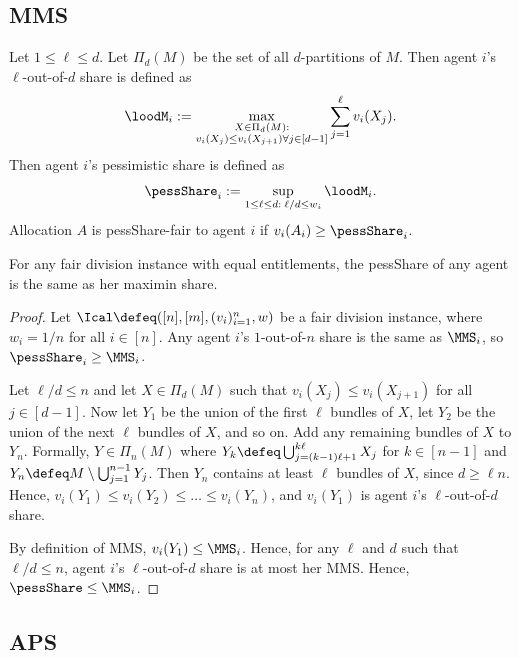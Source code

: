 \subsection{MMS}
\label{sec:notions:mms}

\begin{definition}
\label{defn:pessShare}
Let $1 \le \ell \le d$. Let $\Pi_d(M)$ be the set of all $d$-partitions of $M$.
Then agent $i$'s $\ell$-out-of-$d$ share is defined as
\[ \loodM_i := \max_{\substack{X \in \Pi_d(M):\\v_i(X_j) \le v_i(X_{j+1}) \forall j \in [d-1]}} \sum_{j=1}^{\ell} v_i(X_j). \]
Then agent $i$'s pessimistic share is defined as
\[ \pessShare_i := \sup_{1 \le \ell \le d:\;\ell / d \le w_i} \loodM_i. \]
Allocation $A$ is pessShare-fair to agent $i$ if $v_i(A_i) \ge \pessShare_i$.
\end{definition}

\begin{lemma}
\label{thm:pess-is-mms}
For any fair division instance with equal entitlements,
the pessShare of any agent is the same as her maximin share.
\end{lemma}
\begin{proof}
Let $\Ical \defeq ([n], [m], (v_i)_{i=1}^n, w)$ be a fair division instance,
where $w_i = 1/n$ for all $i \in [n]$.
Any agent $i$'s $1$-out-of-$n$ share is the same as $\MMS_i$, so $\pessShare_i \ge \MMS_i$.

Let $\ell/d \le n$ and let $X \in \Pi_d(M)$ such that $v_i(X_j) \le v_i(X_{j+1})$ for all $j \in [d-1]$.
Now let $Y_1$ be the union of the first $\ell$ bundles of $X$,
let $Y_2$ be the union of the next $\ell$ bundles of $X$, and so on.
Add any remaining bundles of $X$ to $Y_n$.
Formally, $Y \in \Pi_n(M)$ where $Y_k \defeq \bigcup_{j=(k-1)\ell+1}^{k\ell} X_j$ for $k \in [n-1]$
and $Y_n \defeq M \setminus \bigcup_{j=1}^{n-1} Y_j$.
Then $Y_n$ contains at least $\ell$ bundles of $X$, since $d \ge \ell n$.
Hence, $v_i(Y_1) \le v_i(Y_2) \le \ldots \le v_i(Y_n)$,
and $v_i(Y_1)$ is agent $i$'s $\ell$-out-of-$d$ share.

By definition of MMS, $v_i(Y_1) \le \MMS_i$.
Hence, for any $\ell$ and $d$ such that $\ell/d \le n$,
agent $i$'s $\ell$-out-of-$d$ share is at most her MMS.
Hence, $\pessShare \le \MMS_i$.
\end{proof}

\subsection{APS}
\label{sec:notions:aps}

